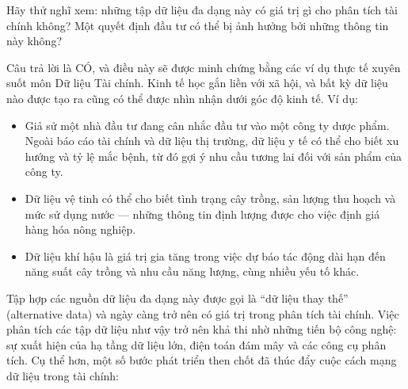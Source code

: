 Hãy thử nghĩ xem: những tập dữ liệu đa dạng này có giá trị gì cho phân tích tài chính không? Một quyết định đầu tư có thể bị ảnh hưởng bởi những thông tin này không?

Câu trả lời là CÓ, và điều này sẽ được minh chứng bằng các ví dụ thực tế xuyên suốt môn Dữ liệu Tài chính. Kinh tế học gắn liền với xã hội, và bất kỳ dữ liệu nào được tạo ra cũng có thể được nhìn nhận dưới góc độ kinh tế. Ví dụ:

\begin{itemize}
  \item Giả sử một nhà đầu tư đang cân nhắc đầu tư vào một công ty dược phẩm. Ngoài báo cáo tài chính và dữ liệu thị trường, dữ liệu y tế có thể cho biết xu hướng và tỷ lệ mắc bệnh, từ đó gợi ý nhu cầu tương lai đối với sản phẩm của công ty.
  \item Dữ liệu vệ tinh có thể cho biết tình trạng cây trồng, sản lượng thu hoạch và mức sử dụng nước — những thông tin định lượng được cho việc định giá hàng hóa nông nghiệp.
  \item Dữ liệu khí hậu là giá trị gia tăng trong việc dự báo tác động dài hạn đến năng suất cây trồng và nhu cầu năng lượng, cùng nhiều yếu tố khác.
\end{itemize}

Tập hợp các nguồn dữ liệu đa dạng này được gọi là ``dữ liệu thay thế'' (alternative data) và ngày càng trở nên có giá trị trong phân tích tài chính. Việc phân tích các tập dữ liệu như vậy trở nên khả thi nhờ những tiến bộ công nghệ: sự xuất hiện của hạ tầng dữ liệu lớn, điện toán đám mây và các công cụ phân tích. Cụ thể hơn, một số bước phát triển then chốt đã thúc đẩy cuộc cách mạng dữ liệu trong tài chính:

